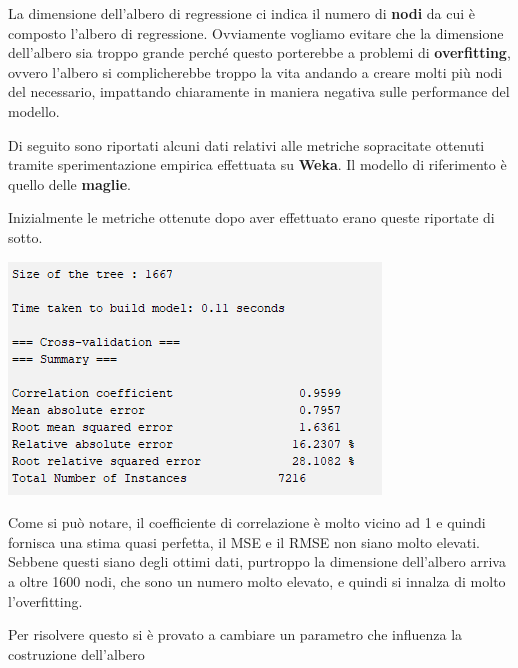 \documentclass[a4paper, 11pt, oneside]{report}
\begin{document}
                \par \noindent La dimensione dell'albero di regressione ci indica il numero di \textbf{nodi} da cui è
                composto l'albero di regressione.
                Ovviamente vogliamo evitare che la dimensione dell'albero sia troppo grande perché questo porterebbe a problemi
                di \textbf{overfitting}, ovvero l'albero si complicherebbe troppo la vita andando a creare molti più nodi
                del necessario, impattando chiaramente in maniera negativa sulle performance del modello.
                \par \noindent
                \par \noindent Di seguito sono riportati alcuni dati relativi alle metriche sopracitate ottenuti tramite
                sperimentazione empirica effettuata su \textbf{Weka}.
                Il modello di riferimento è quello delle \textbf{maglie}.
                \par \noindent Inizialmente le metriche ottenute dopo aver effettuato erano queste riportate di sotto.
                \par \noindent
                \begin{center}
                    \includegraphics{metricheIniziali}
                \end{center}
                \par \noindent Come si può notare, il coefficiente di correlazione è molto vicino ad 1 e quindi
                fornisca una stima quasi perfetta, il MSE e il RMSE non siano molto elevati.
                Sebbene questi siano degli ottimi dati, purtroppo la dimensione dell'albero arriva a oltre 1600 nodi, che
                sono un numero molto elevato, e quindi si innalza di molto l'overfitting.
                \par \noindent
                \par \noindent Per risolvere questo si è provato a cambiare un parametro che influenza la costruzione dell'albero
\end{document}
